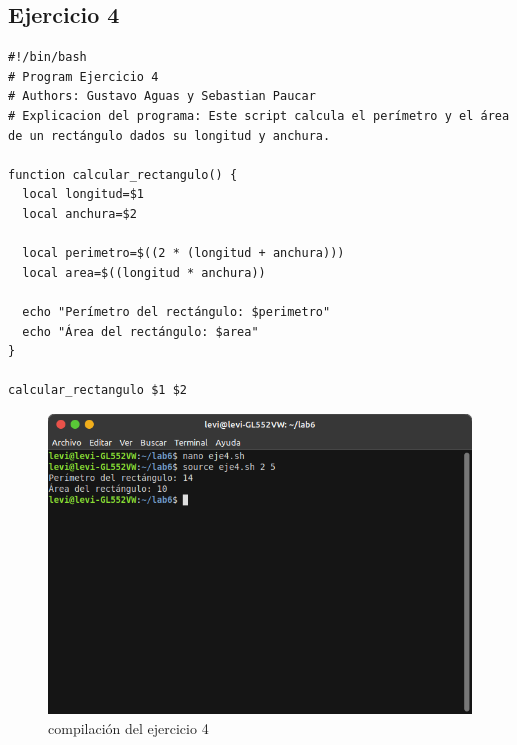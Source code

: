 \documentclass[11pt,twoside]{book}
\begin{document}
\subsection{Ejercicio 4}
\begin{lstlisting}
#!/bin/bash
# Program Ejercicio 4
# Authors: Gustavo Aguas y Sebastian Paucar
# Explicacion del programa: Este script calcula el perímetro y el área de un rectángulo dados su longitud y anchura.

function calcular_rectangulo() {
  local longitud=$1
  local anchura=$2

  local perimetro=$((2 * (longitud + anchura)))
  local area=$((longitud * anchura))

  echo "Perímetro del rectángulo: $perimetro"
  echo "Área del rectángulo: $area"
}

calcular_rectangulo $1 $2
\end{lstlisting}
\begin{figure}[h]
    \centering
    \includegraphics[width=0.8\linewidth]{img_tarea6/eje4con.png}
    \caption{ compilación del ejercicio 4}
\end{figure}
\newpage
\end{document}
